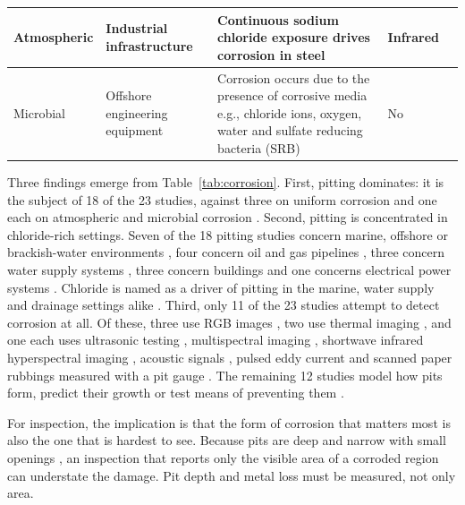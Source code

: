 {\begin{xltabular}{\textwidth}{>{\RaggedRight\arraybackslash}p{1.5cm}>{\RaggedRight\arraybackslash}p{2.6cm}>{\RaggedRight\arraybackslash}X>{\RaggedRight\arraybackslash}p{2.4cm}>{\RaggedRight\arraybackslash}p{1.9cm}}
\midrule
Atmospheric & Industrial infrastructure & Continuous sodium chloride exposure drives corrosion in steel & Infrared & \citep{DeKerf2022} \\
\midrule
Microbial & Offshore engineering equipment & Corrosion occurs due to the presence of corrosive media e.g., chloride ions, oxygen, water and sulfate reducing bacteria (SRB) & No & \citep{Liang2021} \\
\end{xltabular}
}


Three findings emerge from Table~\ref{tab:corrosion}. First, pitting dominates:
it is the subject of 18 of the 23 studies, against three on uniform corrosion
\citep{Khodabux2020,Yang2025,Yang2026a} and one each on atmospheric \citep{DeKerf2022} and microbial corrosion \citep{Liang2021}.
Second, pitting is concentrated in chloride-rich settings. Seven of the 18
pitting studies concern marine, offshore or brackish-water environments
\citep{Liu2026,Wang2021,Khodabux2021,Nugroho2021,Mao2026,Khodabux2021a,Suzuki2026}, four concern oil and gas pipelines
\citep{Akhlaghi2023,Arzaghi2020,Malashin2024,Huang2026a}, three concern water supply systems \citep{Li2022,Nguyen2026,Liu2021}, three concern
buildings \citep{Elizalde2023,Qin2026,Egodawela2025} and one concerns electrical power systems \citep{Wojciechowski2025}.
Chloride is named as a driver of pitting in the marine, water supply and
drainage settings alike \citep{Liu2026,Li2022,Nguyen2026,Suzuki2026,Khodabux2021a}. Third, only 11 of the 23 studies
attempt to detect corrosion at all. Of these, three use RGB images
\citep{Malashin2024,Mao2026,Suzuki2026}, two use thermal imaging \citep{Elizalde2023,Liu2021}, and one each uses ultrasonic
testing \citep{Huang2026a}, multispectral imaging \citep{Egodawela2025}, shortwave infrared
hyperspectral imaging \citep{DeKerf2022}, acoustic signals \citep{Yang2026a}, pulsed eddy current
\citep{Yang2025} and scanned paper rubbings measured with a pit gauge \citep{Khodabux2021a}. The remaining
12 studies model how pits form, predict their growth or test means of preventing
them \citep{Liu2026,Li2022,Nguyen2026,Wang2021,Qin2026,Akhlaghi2023,Wojciechowski2025,Khodabux2020,Liang2021,Khodabux2021,Nugroho2021,Arzaghi2020}.

For inspection, the implication is that the form of corrosion that matters most
is also the one that is hardest to see. Because pits are deep and narrow with
small openings \citep{Soares2023}, an inspection that reports only the visible area of a
corroded region can understate the damage. Pit depth and metal loss must be
measured, not only area.


